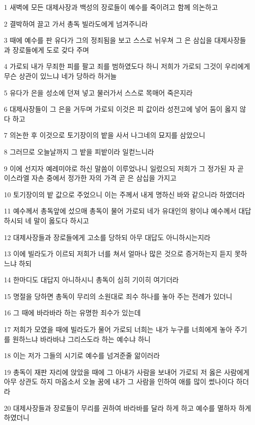 \par 1 새벽에 모든 대제사장과 백성의 장로들이 예수를 죽이려고 함께 의논하고
\par 2 결박하여 끌고 가서 총독 빌라도에게 넘겨주니라
\par 3 때에 예수를 판 유다가 그의 정죄됨을 보고 스스로 뉘우쳐 그 은 삼십을 대제사장들과 장로들에게 도로 갖다 주며
\par 4 가로되 내가 무죄한 피를 팔고 죄를 범하였도다 하니 저희가 가로되 그것이 우리에게 무슨 상관이 있느냐 네가 당하라 하거늘
\par 5 유다가 은을 성소에 던져 넣고 물러가서 스스로 목매어 죽은지라
\par 6 대제사장들이 그 은을 거두며 가로되 이것은 피 값이라 성전고에 넣어 둠이 옳지 않다 하고
\par 7 의논한 후 이것으로 토기장이의 밭을 사서 나그네의 묘지를 삼았으니
\par 8 그러므로 오늘날까지 그 밭을 피밭이라 일컫느니라
\par 9 이에 선지자 예레미야로 하신 말씀이 이루었나니 일렀으되 저희가 그 정가된 자 곧 이스라엘 자손 중에서 정가한 자의 가격 곧 은 삼십을 가지고
\par 10 토기장이의 밭 값으로 주었으니 이는 주께서 내게 명하신 바와 같으니라 하였더라
\par 11 예수께서 총독앞에 섰으매 총독이 물어 가로되 네가 유대인의 왕이냐 예수께서 대답하시되 네 말이 옳도다 하시고
\par 12 대제사장들과 장로들에게 고소를 당하되 아무 대답도 아니하시는지라
\par 13 이에 빌라도가 이르되 저희가 너를 쳐서 얼마나 많은 것으로 증거하는지 듣지 못하느냐 하되
\par 14 한마디도 대답지 아니하시니 총독이 심히 기이히 여기더라
\par 15 명절을 당하면 총독이 무리의 소원대로 죄수 하나를 놓아 주는 전례가 있더니
\par 16 그 때에 바라바라 하는 유명한 죄수가 있는데
\par 17 저희가 모였을 때에 빌라도가 물어 가로되 너희는 내가 누구를 너희에게 놓아 주기를 원하느냐 바라바냐 그리스도라 하는 예수냐 하니
\par 18 이는 저가 그들의 시기로 예수를 넘겨준줄 앎이러라
\par 19 총독이 재판 자리에 앉았을 때에 그 아내가 사람을 보내어 가로되 저 옳은 사람에게 아무 상관도 하지 마옵소서 오늘 꿈에 내가 그 사람을 인하여 애를 많이 썼나이다 하더라
\par 20 대제사장들과 장로들이 무리를 권하여 바라바를 달라 하게 하고 예수를 멸하자 하게 하였더니
